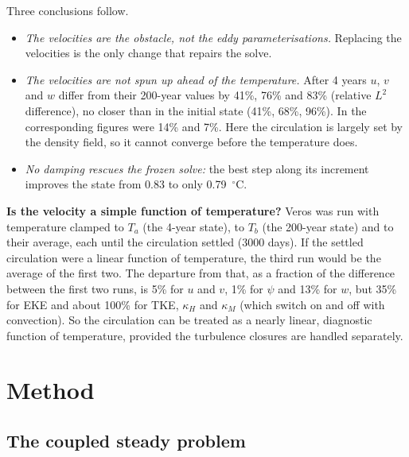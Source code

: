 \documentclass{article}
\begin{document}
Three conclusions follow.
\begin{itemize}
\item \emph{The velocities are the obstacle, not the eddy parameterisations.} Replacing the velocities is the only change that repairs the solve.
\item \emph{The velocities are not spun up ahead of the temperature.} After 4 years $u$, $v$ and $w$ differ from their 200-year values by 41\%, 76\% and 83\% (relative $L^2$ difference), no closer than in the initial state (41\%, 68\%, 96\%). In \citet{cooper2017} the corresponding figures were 14\% and 7\%. Here the circulation is largely set by the density field, so it cannot converge before the temperature does.
\item \emph{No damping rescues the frozen solve:} the best step along its increment improves the state from 0.83 to only 0.79~$^\circ$C.
\end{itemize}

\textbf{Is the velocity a simple function of temperature?} Veros was run with temperature clamped to $T_a$ (the 4-year state), to $T_b$ (the 200-year state) and to their average, each until the circulation settled (3000 days). If the settled circulation were a linear function of temperature, the third run would be the average of the first two. The departure from that, as a fraction of the difference between the first two runs, is 5\% for $u$ and $v$, 1\% for $\psi$ and 13\% for $w$, but 35\% for EKE and about 100\% for TKE, $\kappa_H$ and $\kappa_M$ (which switch on and off with convection). So the circulation can be treated as a nearly linear, diagnostic function of temperature, provided the turbulence closures are handled separately.

\section{Method}\label{sec:method}

\subsection{The coupled steady problem}\label{sec:problem}
\end{document}

